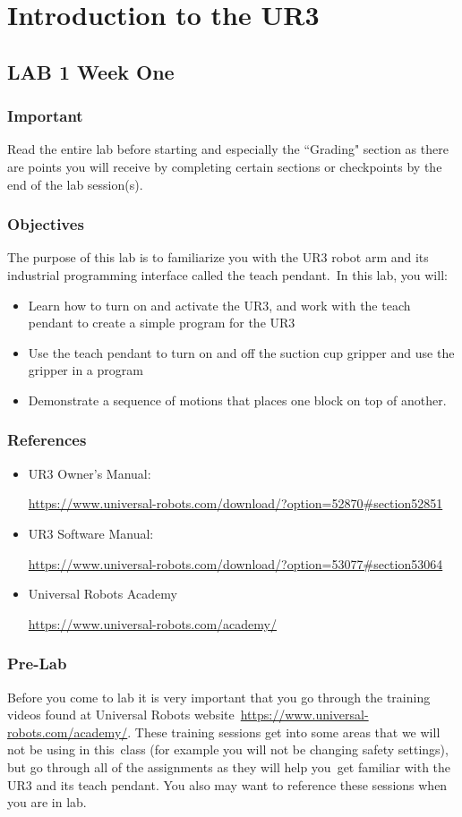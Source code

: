 \chapter{Introduction to the UR3}
\section{LAB 1 Week One}
\subsection{Important}
Read the entire lab before starting and especially the ``Grading" section as there are points you will receive by completing certain sections or checkpoints
by the end of the lab session(s). 
\subsection{Objectives}
The purpose of this lab is to familiarize you with the UR3 robot arm and its industrial programming interface called the teach pendant.\
In this lab, you will:
\begin{itemize}
\item Learn how to turn on and activate the UR3, and work with the teach pendant to create a simple program for the UR3
\item Use the teach pendant to turn on and off the suction cup gripper and use the gripper in a program
\item Demonstrate a sequence of motions that places one block on top of another.
\end{itemize}

\subsection{References}
\begin{itemize}
\item UR3 Owner's Manual:

\url{https://www.universal-robots.com/download/?option=52870#section52851}
\item UR3 Software Manual:

\url{https://www.universal-robots.com/download/?option=53077#section53064}
\item Universal Robots Academy

\url{https://www.universal-robots.com/academy/}
\end{itemize}

\subsection{Pre-Lab}
Before you come to lab it is very important that you go through the training videos found at Universal Robots website\
\url{https://www.universal-robots.com/academy/}.  These training sessions get into some areas that we will not be using in this\ 
class (for example you will not be changing safety settings), but go through all of the assignments as they will help you\ 
get familiar with the UR3 and its teach pendant.  You also may want to reference these sessions when you are in lab.  

